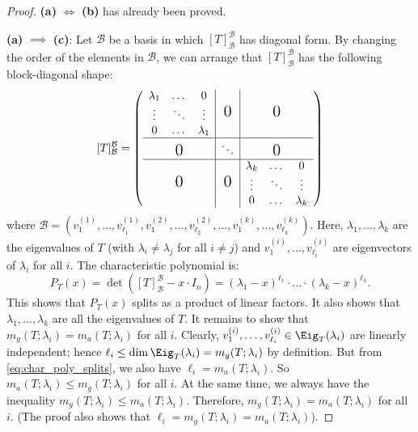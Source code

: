 \begin{proof}
  \textbf{(a)} $\iff$ \textbf{(b)} has already been proved.

  \textbf{(a)} $\implies$ \textbf{(c)}: Let $\mathcal{B}$ be a basis in which $[T]_{\mathcal{B}}^{\mathcal{B}}$ has diagonal form. By changing the order of the elements in $\mathcal{B}$, we can arrange that $[T]_{\mathcal{B}}^{\mathcal{B}}$ has the following block-diagonal shape:
  \begin{equation} \label{eq:ordered_diag_matrix}
    [T]_{\mathcal{B}}^{\mathcal{B}} = \left( \begin{array}{c|c|c}
      \begin{matrix} \lambda_1 & \dots & 0 \\ \vdots & \ddots & \vdots \\ 0 & \dots & \lambda_1 \end{matrix} & \text{\Large 0} & \text{\Large 0} \\
      \hline
      \text{\Large 0} & \ddots & \text{\Large 0} \\
      \hline
      \text{\Large 0} & \text{\Large 0} & \begin{matrix} \lambda_k & \dots & 0 \\ \vdots & \ddots & \vdots \\ 0 & \dots & \lambda_k \end{matrix}
    \end{array} \right)
  \end{equation}
  where $\mathcal{B} = (v_1^{(1)}, \dots, v_{\ell_1}^{(1)}, v_1^{(2)}, \dots, v_{\ell_2}^{(2)}, \dots, v_1^{(k)}, \dots, v_{\ell_k}^{(k)})$.
  Here, $\lambda_1, \dots, \lambda_k$ are the eigenvalues of $T$ (with $\lambda_i \ne \lambda_j$ for all $i \ne j$) and $v_1^{(i)}, \dots, v_{\ell_i}^{(i)}$ are eigenvectors of $\lambda_i$ for all $i$. The characteristic polynomial is:
  \begin{equation} \label{eq:char_poly_splits}
    P_T(x) = \det([T]_{\mathcal{B}}^{\mathcal{B}} - x \cdot I_n) = (\lambda_1 - x)^{\ell_1} \cdot \dots \cdot (\lambda_k - x)^{\ell_k}.
  \end{equation}
  This shows that $P_T(x)$ splits as a product of linear factors. It also shows that $\lambda_1, \dots, \lambda_k$ are all the eigenvalues of $T$. It remains to show that $m_g(T; \lambda_i) = m_a(T; \lambda_i)$ for all $i$.
  Clearly, $v_1^{(i)}, \dots, v_{\ell_i}^{(i)} \in \Eig_T(\lambda_i)$ are linearly independent; hence $\ell_i \le \dim \Eig_T(\lambda_i) = m_g(T; \lambda_i)$ by definition.
  But from \eqref{eq:char_poly_splits}, we also have $\ell_i = m_a(T; \lambda_i)$.
  So $m_a(T; \lambda_i) \le m_g(T; \lambda_i)$ for all $i$. At the same time, we always have the inequality $m_g(T; \lambda_i) \le m_a(T; \lambda_i)$.
  Therefore, $m_g(T; \lambda_i) = m_a(T; \lambda_i)$ for all $i$. (The proof also shows that $\ell_i = m_g(T; \lambda_i) = m_a(T; \lambda_i)$).


\end{proof}
